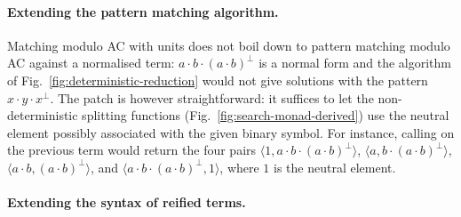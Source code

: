 \documentclass{llncs}
\begin{document}
\paragraph{Extending the pattern matching algorithm.}

Matching modulo AC with units does not boil down to pattern matching
modulo AC against a normalised term: $a\cdot b\cdot (a\cdot b)^\perp$
is a normal form and the algorithm of
Fig.~\ref{fig:deterministic-reduction} would not give solutions with
the pattern $x\cdot y\cdot x^\perp$. The patch is however
straightforward: it suffices to let the non-deterministic splitting
functions (Fig.~\ref{fig:search-monad-derived}) use the neutral
element possibly associated with the given binary symbol. For
instance, calling  on the previous term would return the
four pairs
$\langle 1,a\cdot b\cdot (a\cdot b)^\perp\rangle$, $\langle a,b\cdot (a\cdot b)^\perp\rangle$, $\langle a\cdot b,(a\cdot b)^\perp\rangle$, and $\langle a\cdot b\cdot (a\cdot b)^\perp,1\rangle$, where $1$ is the
neutral element. 

\paragraph{Extending the syntax of reified terms.}
\end{document}
